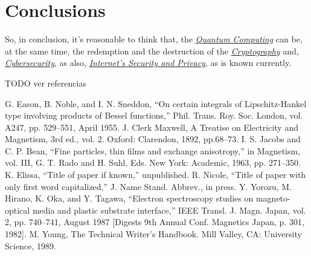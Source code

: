 \documentclass[conference]{IEEEtran}
\begin{document}
\vspace{6pt}

\section*{Conclusions}

So, in conclusion, it's reasonable to think that, the \href{https://en.wikipedia.org/wiki/Quantum_computing}{\textit{Quantum Computing}} can be, at the same time, the redemption and the destruction of the \href{https://en.wikipedia.org/wiki/Cryptography}{\textit{Cryptography}}  and, \href{https://en.wikipedia.org/wiki/Computer_security}{\textit{Cybersecurity}}, as also, \href{https://en.wikipedia.org/wiki/Computer_security}{\textit{Internet's Security and Privacy}}, as is known currently.

\vspace{6pt}

TODO ver referencias

\begin{thebibliography}{00}
 G. Eason, B. Noble, and I. N. Sneddon, ``On certain integrals of Lipschitz-Hankel type involving products of Bessel functions,'' Phil. Trans. Roy. Soc. London, vol. A247, pp. 529--551, April 1955.
 J. Clerk Maxwell, A Treatise on Electricity and Magnetism, 3rd ed., vol. 2. Oxford: Clarendon, 1892, pp.68--73.
 I. S. Jacobs and C. P. Bean, ``Fine particles, thin films and exchange anisotropy,'' in Magnetism, vol. III, G. T. Rado and H. Suhl, Eds. New York: Academic, 1963, pp. 271--350.
 K. Elissa, ``Title of paper if known,'' unpublished.
 R. Nicole, ``Title of paper with only first word capitalized,'' J. Name Stand. Abbrev., in press.
 Y. Yorozu, M. Hirano, K. Oka, and Y. Tagawa, ``Electron spectroscopy studies on magneto-optical media and plastic substrate interface,'' IEEE Transl. J. Magn. Japan, vol. 2, pp. 740--741, August 1987 [Digests 9th Annual Conf. Magnetics Japan, p. 301, 1982].
 M. Young, The Technical Writer's Handbook. Mill Valley, CA: University Science, 1989.
\end{thebibliography}

\vspace{10pt}
\end{document}
